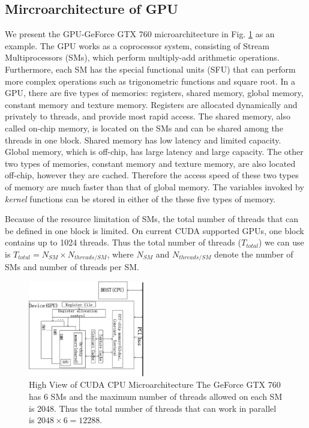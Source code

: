 \documentclass[letterpaper, 10pt, conference, twoside]{ieeeconf}
\begin{document}
\subsection{Mircroarchitecture of GPU} 
We present the GPU-GeForce GTX 760 microarchitecture in Fig. \ref{figure2} as an example. The GPU works as a coprocessor system, consisting of Stream Multiprocessors (SMs), which perform multiply-add arithmetic operations. Furthermore, each SM has the special functional units (SFU) that can perform more complex operations such as trigonometric functions and square root. In a GPU, there are five types of memories: registers, shared memory, global memory, constant memory and texture memory. Registers are allocated dynamically and privately to threads, and provide most rapid access. The shared memory, also called on-chip memory, is located on the SMs and can be shared among the threads in one block. Shared memory has low latency and limited capacity. Global memory, which is off-chip, has large latency and large capacity. The other two types of memories, constant memory and texture memory, are also located off-chip, however they are cached. Therefore the access speed of these two types of memory are much faster than that of global memory. The variables invoked by \textit{kernel} functions can be stored in either of the these five types of memory.

Because of the resource limitation of SMs, the total number of threads that can be defined in one block is limited. On current CUDA supported GPUs, one block contains up to 1024 threads. Thus the total number of threads ($T_{total}$) we can use is $T_{total}=N_{SM}\times N_{threads/SM} $, where $N_{SM}$ and $N_{threads/SM}$ denote the number of SMs and number of threads per SM.  
\begin{figure}[htb]
\centering
\includegraphics[width=0.45\textwidth]{High_view_of_CUDA_GPU_microarchitecture.eps}
\caption{ High View of CUDA CPU Microarchitecture
The GeForce GTX 760 has 6 SMs and the maximum number of threads allowed on each SM is 2048. Thus the total number of threads that can work in parallel is $2048\times 6=12288$.
}
\label{figure2}
\end{figure}   
\end{document}
